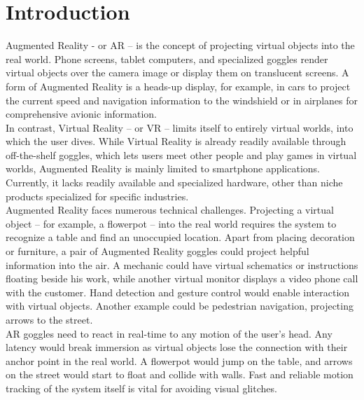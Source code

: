 \chapter{Introduction}
\label{sec:Introduction}
Augmented Reality - or AR – is the concept of projecting virtual objects into the real world. Phone screens, tablet computers, and specialized goggles render virtual objects over the camera image or display them on translucent screens. A form of Augmented Reality is a heads-up display, for example, in cars to project the current speed and navigation information to the windshield or in airplanes for comprehensive avionic information.\\
In contrast, Virtual Reality – or VR – limits itself to entirely virtual worlds, into which the user dives. While Virtual Reality is already readily available through off-the-shelf goggles, which lets users meet other people and play games in virtual worlds, Augmented Reality is mainly limited to smartphone applications. Currently, it lacks readily available and specialized hardware, other than niche products specialized for specific industries.\\
Augmented Reality faces numerous technical challenges. Projecting a virtual object – for example, a flowerpot – into the real world requires the system to recognize a table and find an unoccupied location. Apart from placing decoration or furniture, a pair of Augmented Reality goggles could project helpful information into the air. A mechanic could have virtual schematics or instructions floating beside his work, while another virtual monitor displays a video phone call with the customer. Hand detection and gesture control would enable interaction with virtual objects. Another example could be pedestrian navigation, projecting arrows to the street. \\
AR goggles need to react in real-time to any motion of the user’s head. Any latency would break immersion as virtual objects lose the connection with their anchor point in the real world. A flowerpot would jump on the table, and arrows on the street would start to float and collide with walls. Fast and reliable motion tracking of the system itself is vital for avoiding visual glitches.
